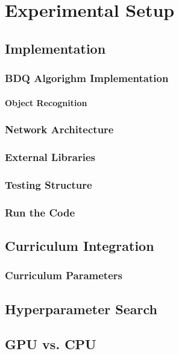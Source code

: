 
\chapter{Experimental Setup}\label{chapter:experimental_setup}

\section{Implementation}
    \subsection{BDQ Algorighm Implementation}
    \subsubsection{Object Recognition}
    \subsection{Network Architecture}
    \subsection{External Libraries}
    \subsection{Testing Structure}
    \subsection{Run the Code}
\section{Curriculum Integration}
    \subsection{Curriculum Parameters}
\section{Hyperparameter Search}
\section{GPU vs. CPU}

